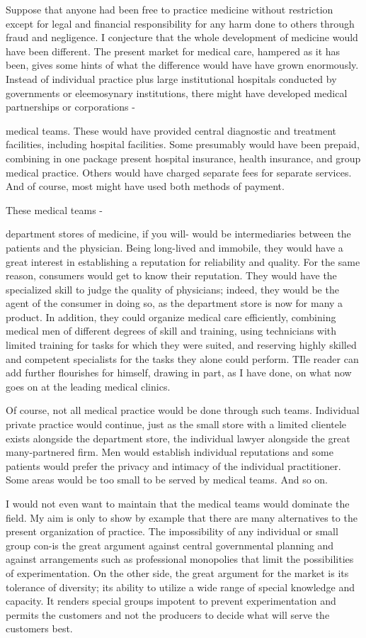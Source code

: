 \documentclass[11pt,openany]{book}
\begin{document}
Suppose that anyone had been free to practice medicine without restriction except for legal and financial responsibility for any harm done to others through fraud and negligence. I conjecture that the whole development of medicine would have been different. The present market for medical care, hampered as it has been, gives some hints of what the difference would have have grown enormously. Instead of individual practice plus large institutional hospitals conducted by governments or eleemosynary institutions, there might have developed medical partnerships or corporations -

medical teams. These would have provided central diagnostic and treatment facilities, including hospital facilities. Some presumably would have been prepaid, combining in one package present hospital insurance, health insurance, and group medical practice. Others would have charged separate fees for separate services. And of course, most might have used both methods of payment.

These medical teams -

department stores of medicine, if you will- would be intermediaries between the patients and the physician. Being long-lived and immobile, they would have a great interest in establishing a reputation for reliability and quality. For the same reason, consumers would get to know their reputation. They would have the specialized skill to judge the quality of physicians; indeed, they would be the agent of the consumer in doing so, as the department store is now for many a product. In addition, they could organize medical care efficiently, combining medical men of different degrees of skill and training, using technicians with limited training for tasks for which they were suited, and reserving highly skilled and competent specialists for the tasks they alone could perform. TIle reader can add further flourishes for himself, drawing in part, as I have done, on what now goes on at the leading medical clinics.

Of course, not all medical practice would be done through such teams. Individual private practice would continue, just as the small store with a limited clientele exists alongside the department store, the individual lawyer alongside the great many-partnered firm. Men would establish individual reputations and some patients would prefer the privacy and intimacy of the individual practitioner. Some areas would be too small to be served by medical teams. And so on.

I would not even want to maintain that the medical teams would dominate the field. My aim is only to show by example that there are many alternatives to the present organization of practice. The impossibility of any individual or small group con-is the great argument against central governmental planning and against arrangements such as professional monopolies that limit the possibilities of experimentation. On the other side, the great argument for the market is its tolerance of diversity; its ability to utilize a wide range of special knowledge and capacity. It renders special groups impotent to prevent experimentation and permits the customers and not the producers to decide what will serve the customers best.
\end{document}
